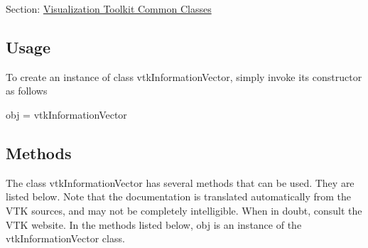 Section\-: \hyperlink{sec_vtkcommon}{Visualization Toolkit Common Classes} \hypertarget{vtkwidgets_vtkxyplotwidget_Usage}{}\subsection{Usage}\label{vtkwidgets_vtkxyplotwidget_Usage}
To create an instance of class vtk\-Information\-Vector, simply invoke its constructor as follows \begin{DoxyVerb}  obj = vtkInformationVector
\end{DoxyVerb}
 \hypertarget{vtkwidgets_vtkxyplotwidget_Methods}{}\subsection{Methods}\label{vtkwidgets_vtkxyplotwidget_Methods}
The class vtk\-Information\-Vector has several methods that can be used. They are listed below. Note that the documentation is translated automatically from the V\-T\-K sources, and may not be completely intelligible. When in doubt, consult the V\-T\-K website. In the methods listed below, {\ttfamily obj} is an instance of the vtk\-Information\-Vector class. 
